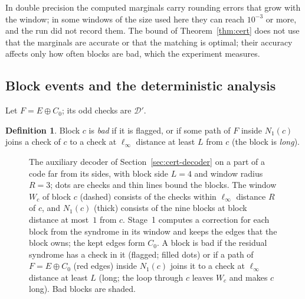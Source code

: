 \documentclass[11pt]{amsart}
\theoremstyle{definition}
\newtheorem{definition}[theorem]{Definition}
\theoremstyle{remark}
\numberwithin{equation}{section}
\newcommand{\cD}{\mathcal{D}}
\begin{document}
In double precision the computed marginals carry rounding errors that grow with the window; in some windows of the size used here they can reach $10^{-3}$ or more, and the run did not record them. The bound of Theorem~\ref{thm:cert} does not use that the marginals are accurate or that the matching is optimal; their accuracy affects only how often blocks are bad, which the experiment measures.

\subsection{Block events and the deterministic analysis}\label{sec:cert-lemma}
Let $F=E\oplus C_0$; its odd checks are $\cD'$.

\begin{definition}\label{def:cert-bad}
Block $c$ is \emph{bad} if it is flagged, or if some path of $F$ inside $N_1(c)$ joins a check of $c$ to a check at $\ell_\infty$ distance at least $L$ from $c$ (the block is \emph{long}).
\end{definition}

\begin{figure}[t]
\centering
{}
\caption{The auxiliary decoder of Section~\ref{sec:cert-decoder} on a part of a code far from its sides, with block side $L=4$ and window radius $R=3$; dots are checks and thin lines bound the blocks. The window $W_c$ of block $c$ (dashed) consists of the checks within $\ell_\infty$ distance $R$ of $c$, and $N_1(c)$ (thick) consists of the nine blocks at block distance at most~$1$ from $c$. Stage~1 computes a correction for each block from the syndrome in its window and keeps the edges that the block owns; the kept edges form $C_0$. A block is bad if the residual syndrome has a check in it (flagged; filled dots) or if a path of $F=E\oplus C_0$ (red edges) inside $N_1(c)$ joins it to a check at $\ell_\infty$ distance at least $L$ (long; the loop through $c$ leaves $W_c$ and makes $c$ long). Bad blocks are shaded.}
\label{fig:blocks}
\end{figure}
\end{document}
